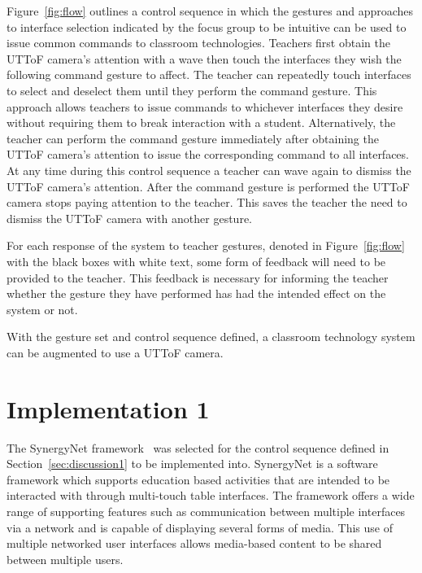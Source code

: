 \documentclass[manuscript, review, screen]{acmart}
\begin{document}
Figure~\ref{fig:flow} outlines a control sequence in which the gestures and approaches to interface selection indicated by the focus group to be intuitive can be used to issue common commands to classroom technologies.
Teachers first obtain the \ac{UTToF} camera's attention with a wave then touch the interfaces they wish the following command gesture to affect.
The teacher can repeatedly touch interfaces to select and deselect them until they perform the command gesture.
This approach allows teachers to issue commands to whichever interfaces they desire without requiring them to break interaction with a student.
Alternatively, the teacher can perform the command gesture immediately after obtaining the \ac{UTToF} camera's attention to issue the corresponding command to all interfaces.
At any time during this control sequence a teacher can wave again to dismiss the \ac{UTToF} camera's attention.
After the command gesture is performed the \ac{UTToF} camera stops paying attention to the teacher.
This saves the teacher the need to dismiss the \ac{UTToF} camera with another gesture.

For each response of the system to teacher gestures, denoted in Figure~\ref{fig:flow} with the black boxes with white text, some form of feedback will need to be provided to the teacher.
This feedback is necessary for informing the teacher whether the gesture they have performed has had the intended effect on the system or not.

With the gesture set and control sequence defined, a classroom technology system can be augmented to use a \ac{UTToF} camera.


\section{Implementation 1}
\label{sec:implementation1}


The SynergyNet framework~\cite{Higgins2011} was selected for the control sequence defined in Section~\ref{sec:discussion1} to be implemented into.
SynergyNet is a software framework which supports education based activities that are intended to be interacted with through multi-touch table interfaces.
The framework offers a wide range of supporting features such as communication between multiple interfaces via a network and is capable of displaying several forms of media.
This use of multiple networked user interfaces allows media-based content to be shared between multiple users.
\end{document}
